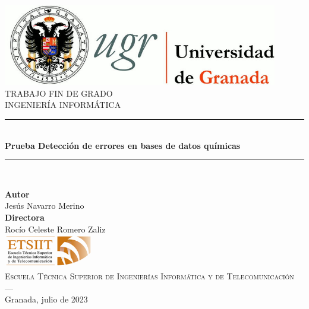 \begin{titlepage}
 
 
\newlength{\centeroffset}
\setlength{\centeroffset}{-0.5\oddsidemargin}
\addtolength{\centeroffset}{0.5\evensidemargin}
\thispagestyle{empty}

\noindent\hspace*{\centeroffset}\begin{minipage}{\textwidth}

\centering
\includegraphics[width=0.9\textwidth]{imagenes/logos/logo_ugr.jpg}\\[1.4cm]

\textsc{ \Large TRABAJO FIN DE GRADO\\[0.2cm]}
\textsc{ INGENIERÍA INFORMÁTICA}\\[1cm]
% 
\noindent\rule[-1ex]{\textwidth}{2pt}\\[3ex]
{\Huge\bfseries Prueba Detección de errores en bases de datos químicas\\
}
\noindent\rule[-3ex]{\textwidth}{2pt}\\[3ex]
\end{minipage}

\vspace{1.5cm}
\noindent\hspace*{\centeroffset}\begin{minipage}{\textwidth}
\centering

\textbf{Autor}\\ {Jesús Navarro Merino}\\[2.5ex]
\textbf{Directora}\\
{Rocío Celeste Romero Zaliz}\\[2cm]
\includegraphics[width=0.3\textwidth]{imagenes/logos/etsiit_logo.png}\\[0.1cm]
\textsc{Escuela Técnica Superior de Ingenierías Informática y de Telecomunicación}\\
\textsc{---}\\
Granada, julio de 2023
\end{minipage}
\end{titlepage}

